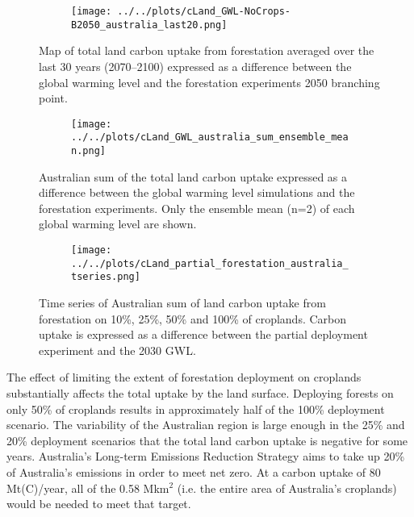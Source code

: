 \documentclass[]{article}
\begin{document}
\begin{figure}[H]
    \centering
    \begin{subfigure}[b]{\linewidth}
        \texttt{[image: ../../plots/cLand\_GWL-NoCrops-B2050\_australia\_last20.png]}
    \end{subfigure}
    \caption{Map of total land carbon uptake from forestation averaged over the last 30 years (2070--2100) expressed as a difference between the global warming level and the forestation experiments 2050 branching point.}
    \label{fig:aus_map_cLand}
\end{figure}

\begin{figure}[H]
    \centering
    \begin{subfigure}[b]{\linewidth}
        \texttt{[image: ../../plots/cLand\_GWL\_australia\_sum\_ensemble\_mean.png]}
    \end{subfigure}
    \caption{Australian sum of the total land carbon uptake expressed as a difference between the global warming level simulations and the forestation experiments. Only the ensemble mean (n=2) of each global warming level are shown.}
    \label{fig:australia_cLand}
\end{figure}

\begin{figure}[H]
    \centering
    \begin{subfigure}[b]{\linewidth}
        \texttt{[image: ../../plots/cLand\_partial\_forestation\_australia\_tseries.png]}
    \end{subfigure}
    \caption{Time series of Australian sum of land carbon uptake from forestation on 10\%, 25\%, 50\% and 100\% of croplands. Carbon uptake is expressed as a difference between the partial deployment experiment and the 2030 GWL.}
    \label{fig:australia_cLand_tseries}
\end{figure}

The effect of limiting the extent of forestation deployment on croplands substantially affects the total uptake by the land surface.
Deploying forests on only 50\% of croplands results in approximately half of the 100\% deployment scenario.
The variability of the Australian region is large enough in the 25\% and 20\% deployment scenarios that the total land carbon uptake is negative for some years.
Australia's Long-term Emissions Reduction Strategy \parencite{australian_australias_2021} aims to take up 20\% of Australia's emissions in order to meet net zero.
At a carbon uptake of 80 Mt(C)/year, all of the 0.58 Mkm$^2$ (i.e. the entire area of Australia's croplands) would be needed to meet that target.
\end{document}
